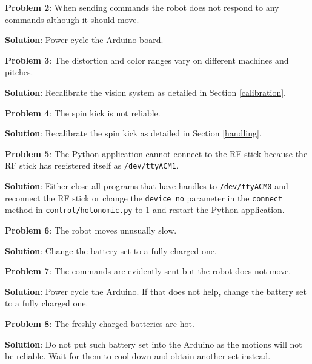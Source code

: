 \documentclass[a4paper,12pt]{article}
\begin{document}
\bigskip

\textbf{Problem 2}: When sending commands the robot does not respond to any commands although it should move.

\textbf{Solution}: Power cycle the Arduino board.

\bigskip

\textbf{Problem 3}: The distortion and color ranges vary on different machines and pitches.

\textbf{Solution}: Recalibrate the vision system as detailed in Section \ref{calibration}.

\bigskip

\textbf{Problem 4}: The spin kick is not reliable.

\textbf{Solution}: Recalibrate the spin kick as detailed in Section \ref{handling}.

\bigskip

\textbf{Problem 5}: The Python application cannot connect to the RF stick because the RF stick has registered itself as \texttt{/dev/ttyACM1}.

\textbf{Solution}: Either close all programs that have handles to \texttt{/dev/ttyACM0} and reconnect the RF stick or change the \texttt{device\_no} parameter in the \texttt{connect} method in \texttt{control/holonomic.py} to 1 and restart the Python application.

\bigskip

\textbf{Problem 6}: The robot moves unusually slow.

\textbf{Solution}: Change the battery set to a fully charged one.

\bigskip

\textbf{Problem 7}: The commands are evidently sent but the robot does not move.

\textbf{Solution}: Power cycle the Arduino. If that does not help, change the battery set to a fully charged one.

\bigskip

\textbf{Problem 8}: The freshly charged batteries are hot.

\textbf{Solution}: Do not put such battery set into the Arduino as the motions will not be reliable. Wait for them to cool down and obtain another set instead.
\end{document}
